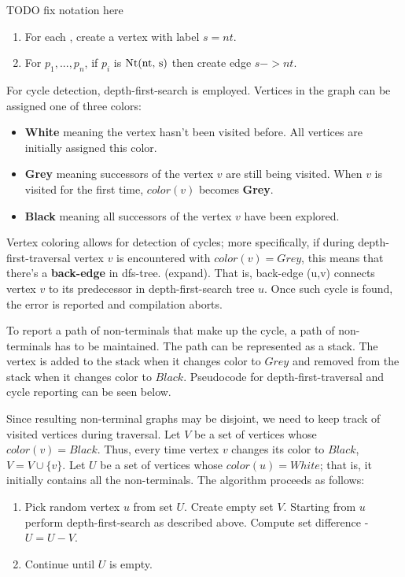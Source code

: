TODO fix notation here

\begin{enumerate}
\item
For each \NtDefinition, create a vertex with label $s=nt$.
\item
For $p_1, ..., p_n$, if $p_i$ is $\Nt$ then create edge $s->nt$.
\end{enumerate}


For cycle detection, depth-first-search is employed. Vertices in the graph can be assigned one of three colors:

\begin{itemize}
\item

\textbf{White} meaning the vertex hasn't been visited before. All vertices are initially assigned this color.

\item
\textbf{Grey} meaning successors of the vertex $v$ are still being visited. When $v$ is visited for the first time, $color(v)$ becomes \textbf{Grey}.
\item
\textbf{Black} meaning all successors of the vertex $v$ have been explored. 
\end{itemize}



Vertex coloring allows for detection of cycles; more specifically, if during depth-first-traversal vertex $v$ is encountered with $color(v)=Grey$, this means that there's a \textbf{back-edge} in dfs-tree. (expand). That is, back-edge (u,v) connects vertex $v$ to its predecessor in depth-first-search tree $u$. Once such cycle is found, the error is reported and compilation aborts.

To report a path of non-terminals that make up the cycle, a path of non-terminals has to be maintained. The path can be represented as a stack. The vertex is added to the stack when it changes color to $Grey$ and removed from the stack when it changes color to $Black$. Pseudocode for depth-first-traversal and cycle reporting can be seen below.

Since resulting non-terminal graphs may be disjoint, we need to keep track of visited vertices during traversal. Let $V$ be a set of vertices whose $color(v)=Black$. Thus, every time vertex $v$ changes its color to $Black$, $V = V \cup \{v\} $. Let $U$ be a set of vertices whose $color(u)=White$; that is, it initially contains all the non-terminals. The algorithm proceeds as follows:

\begin{enumerate}
\item
Pick random vertex $u$ from set $U$. Create empty set $V$. Starting from $u$ perform depth-first-search as described above. Compute set difference - $U = U-V$.
\item
Continue until $U$ is empty.
\end{enumerate}

